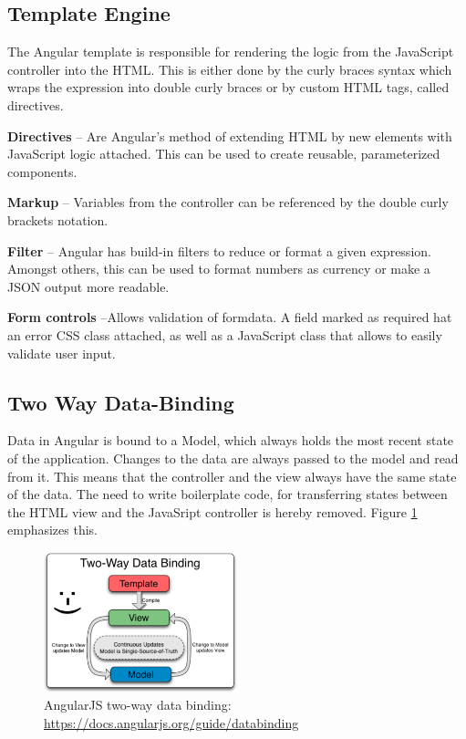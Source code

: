 \subsection{Template Engine}
The Angular template is responsible for rendering the logic from the JavaScript controller into the HTML. This is either done by the curly braces syntax which wraps the expression into double curly braces or by custom HTML tags, called directives.\vspace{1ex}

\noindent\textbf{Directives} -- Are Angular's method of extending HTML by new elements with JavaScript logic attached. This can be used to create reusable, parameterized components.\vspace{1ex}

\noindent\textbf{Markup} -- Variables from the controller can be referenced by the double curly brackets notation.\vspace{1ex}

\noindent\textbf{Filter} -- Angular has build-in filters to reduce or format a given expression. Amongst others, this can be used to format numbers as currency or make a JSON output more readable.\vspace{1ex}

\noindent\textbf{Form controls} --Allows validation of formdata. A field marked as required hat an error CSS class attached, as well as a JavaScript class that allows to easily validate user input.


\subsection{Two Way Data-Binding}
\label{sec:tw-binding}
Data in Angular is bound to a Model, which always holds the most recent state of the application. Changes to the data are always passed to the model and read from it. This means that the controller and the view always have the same state of the data. The need to write boilerplate code, for transferring states between the HTML view and the JavaSript controller is hereby removed. Figure \ref{fig:tw-databinding} emphasizes this.

\begin{figure}[H]
	\centering\includegraphics[width=0.5\textwidth]{res/Two_Way_Data_Binding}
	\caption{AngularJS two-way data binding: \url{https://docs.angularjs.org/guide/databinding}}
	\label{fig:tw-databinding}
\end{figure}


